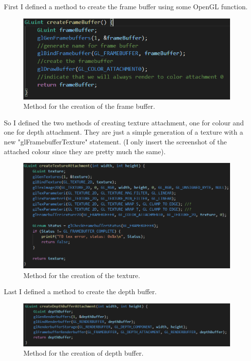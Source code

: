\newpage

\noindent
First I defined a method to create the frame buffer using some OpenGL function.

\begin{figure}[hbt!]
	\centering
	\includegraphics[width= 1
	\textwidth]{images/FBO1.png}
	\caption{Method for the creation of the frame buffer.}
\end{figure} 

\noindent
So I defined the two methods of creating texture attachment, one for colour and one for depth attachment. They are just a simple generation of a texture with a new "glFramebufferTexture" statement. (I only insert the screenshot of the attached colour since they are pretty much the same).

\begin{figure}[hbt!]
	\centering
	\includegraphics[width= 0.9
	\textwidth]{images/FBO2.png}
	\caption{Method for the creation of the texture.}
\end{figure} 

Last I defined a method to create the depth buffer. 

\begin{figure}[hbt!]
	\centering
	\includegraphics[width= 1
	\textwidth]{images/FBO4.png}
	\caption{Method for the creation of depth buffer.}
\end{figure} 


